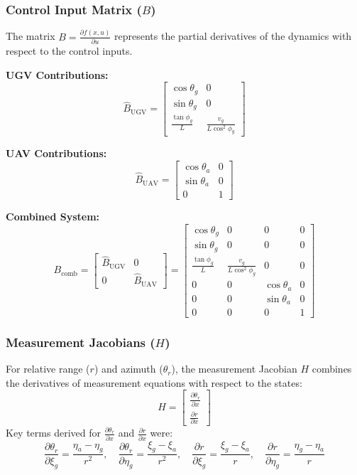 \subsubsection*{Control Input Matrix (\( B \))}
The matrix \( B = \frac{\partial f(x, u)}{\partial u} \) represents the partial derivatives of the dynamics with respect to the control inputs.

\noindent\textbf{UGV Contributions:}
\[
\hat{B}_{\text{UGV}} =
\begin{bmatrix}
\cos\theta_g & 0 \\
\sin\theta_g & 0 \\
\frac{\tan\phi_g}{L} & \frac{v_g}{L \cos^2\phi_g}
\end{bmatrix}
\]

\noindent\textbf{UAV Contributions:}
\[
\hat{B}_{\text{UAV}} =
\begin{bmatrix}
\cos\theta_a & 0 \\
\sin\theta_a & 0 \\
0 & 1
\end{bmatrix}
\]

\noindent\textbf{Combined System:}
\[
B_{\text{comb}} =
\begin{bmatrix}
\hat{B}_{\text{UGV}} & 0 \\
0 & \hat{B}_{\text{UAV}}
\end{bmatrix}
=
\begin{bmatrix}
\cos\theta_g & 0 & 0 & 0 \\
\sin\theta_g & 0 & 0 & 0 \\
\frac{\tan\phi_g}{L} & \frac{v_g}{L \cos^2\phi_g} & 0 & 0 \\
0 & 0 & \cos\theta_a & 0 \\
0 & 0 & \sin\theta_a & 0 \\
0 & 0 & 0 & 1
\end{bmatrix}
\]

\subsubsection*{Measurement Jacobians (\( H \))}

For relative range (\( r \)) and azimuth (\( \theta_r \)), the measurement Jacobian \( H \) combines the derivatives of measurement equations with respect to the states:
\[
H =
\begin{bmatrix}
\frac{\partial \theta_r}{\partial x} \\
\frac{\partial r}{\partial x}
\end{bmatrix}
\]
Key terms derived for \( \frac{\partial \theta_r}{\partial x} \) and \( \frac{\partial r}{\partial x} \) were:
\[
\frac{\partial \theta_r}{\partial \xi_g} = \frac{\eta_a - \eta_g}{r^2}, \quad
\frac{\partial \theta_r}{\partial \eta_g} = \frac{\xi_g - \xi_a}{r^2}, \quad
\frac{\partial r}{\partial \xi_g} = \frac{\xi_g - \xi_a}{r}, \quad
\frac{\partial r}{\partial \eta_g} = \frac{\eta_g - \eta_a}{r}
\]


